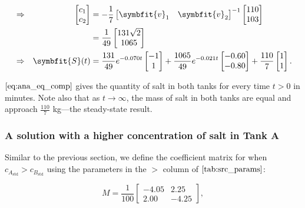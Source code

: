 \begin{align}
  &\Rightarrow& \begin{bmatrix} c_1 \\ c_2 \end{bmatrix} &= 
                          -\frac{1}{7}\begin{bmatrix} \symbfit{v}_1 & \symbfit{v}_2 \end{bmatrix}^{-1} \begin{bmatrix} 110 \\ 103 \end{bmatrix} \\
                          &&&= \frac{1}{49}\begin{bmatrix} 131\sqrt{2} \\ 1065 \end{bmatrix} \\
  &\Rightarrow& \symbfit{S}(t) &= \frac{131}{49}e^{-0.070t}\begin{bmatrix} -1 \\ 1 \end{bmatrix}
  + \frac{1065}{49}e^{-0.021t}\begin{bmatrix} -0.60 \\ -0.80 \end{bmatrix}
  +  \frac{110}{7}\begin{bmatrix} 1 \\ 1  \end{bmatrix}. \label{eq:ana_eq_comp}
\end{align}

\(\autoref{eq:ana_eq_comp}\) gives the quantity of salt in both tanks
for every time \(t > 0\) in minutes. Note also that as \(t \to \infty\),
the mass of salt in both tanks are equal and approach \(\frac{110}{7}\)
kg---the steady-state result.

\subsubsection{A solution with a higher concentration of salt in Tank
A}\label{a-solution-with-a-higher-concentration-of-salt-in-tank-a}

Similar to the previous section, we define the coefficient matrix for
when \(c_{A_{\text{std}}} > c_{B_{\text{std}}}\) using the parameters in
the \(>\) column of \(\autoref{tab:src_params}\):

\begin{equation}
  M = \frac{1}{100}\begin{bmatrix}
        -4.05 & 2.25\\ 2.00 & -4.25
      \end{bmatrix},
\end{equation}

